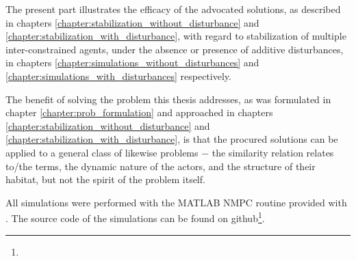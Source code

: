 The present part illustrates the efficacy of the advocated solutions, as
described in chapters \ref{chapter:stabilization_without_disturbance} and
\ref{chapter:stabilization_with_disturbance}, with regard to stabilization
of multiple inter-constrained agents, under the absence or presence
of additive disturbances, in chapters
\ref{chapter:simulations_without_disturbances} and
\ref{chapter:simulations_with_disturbances} respectively.

The benefit of solving the problem this thesis addresses, as was formulated in
chapter \ref{chapter:prob_formulation} and approached in chapters
\ref{chapter:stabilization_without_disturbance} and
\ref{chapter:stabilization_with_disturbance}, is that the procured solutions can
be applied to a general class of likewise problems $-$ the similarity relation
relates to/the terms, the dynamic nature of the actors, and the structure of
their habitat, but not the spirit of the problem itself.

All simulations were performed with the MATLAB NMPC routine provided with
\cite{grune2016nonlinear}. The source code of the simulations can be found on
github\footnote{\githuburl}.

